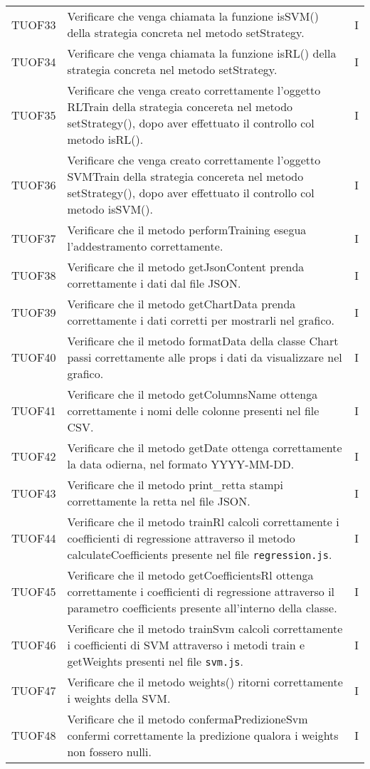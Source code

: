 \begin{longtable}{C{2cm} L{8cm} C{2cm}}
TUOF33 & Verificare che venga chiamata la funzione isSVM() della strategia concreta nel metodo setStrategy. & I \\
TUOF34 & Verificare che venga chiamata la funzione isRL() della strategia concreta nel metodo setStrategy. & I \\
TUOF35 & Verificare che venga creato correttamente l'oggetto RLTrain della strategia concereta nel metodo setStrategy(), dopo aver effettuato il controllo col metodo isRL(). & I \\
TUOF36 & Verificare che venga creato correttamente l'oggetto SVMTrain della strategia concereta nel metodo setStrategy(), dopo aver effettuato il controllo col metodo isSVM(). & I \\
TUOF37 & Verificare che il metodo performTraining esegua l'addestramento correttamente. & I \\
TUOF38 & Verificare che il metodo getJsonContent prenda correttamente i dati dal file JSON. & I \\
TUOF39 & Verificare che il metodo getChartData prenda correttamente i dati corretti per mostrarli nel grafico. & I \\
TUOF40 & Verificare che il metodo formatData della classe Chart passi correttamente alle props i dati da visualizzare nel grafico. & I \\
TUOF41 & Verificare che il metodo getColumnsName ottenga correttamente i nomi delle colonne presenti nel file CSV. & I \\
TUOF42 & Verificare che il metodo getDate ottenga correttamente la data odierna, nel formato YYYY-MM-DD. & I \\
TUOF43 & Verificare che il metodo print\_retta stampi correttamente la retta nel file JSON. & I \\
TUOF44 & Verificare che il metodo trainRl calcoli correttamente i coefficienti di regressione attraverso il metodo calculateCoefficients presente nel file \texttt{regression.js}. & I \\
TUOF45 & Verificare che il metodo getCoefficientsRl ottenga correttamente i coefficienti di regressione attraverso il parametro coefficients presente all'interno della classe. & I \\
TUOF46 & Verificare che il metodo trainSvm calcoli correttamente i coefficienti di SVM attraverso i metodi train e getWeights presenti nel file \texttt{svm.js}. & I \\
TUOF47 & Verificare che il metodo weights() ritorni correttamente i weights della SVM. & I \\
TUOF48 & Verificare che il metodo confermaPredizioneSvm confermi correttamente la predizione qualora i weights non fossero nulli. & I \\


\end{longtable}
